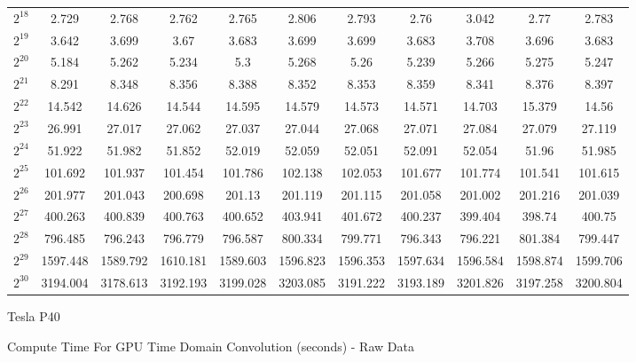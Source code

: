 \begin{center}
\begin{landscape}
\begin{tabular}{c|c|c|c|c|c|c|c|c|c|c}
        $2^{18}$ & 2.729 & 2.768 & 2.762 & 2.765 & 2.806 & 2.793 & 2.76 & 3.042 & 2.77 & 2.783 \\
        $2^{19}$ & 3.642 & 3.699 & 3.67 & 3.683 & 3.699 & 3.699 & 3.683 & 3.708 & 3.696 & 3.683 \\
        $2^{20}$ & 5.184 & 5.262 & 5.234 & 5.3 & 5.268 & 5.26 & 5.239 & 5.266 & 5.275 & 5.247 \\
        $2^{21}$ & 8.291 & 8.348 & 8.356 & 8.388 & 8.352 & 8.353 & 8.359 & 8.341 & 8.376 & 8.397 \\
        $2^{22}$ & 14.542 & 14.626 & 14.544 & 14.595 & 14.579 & 14.573 & 14.571 & 14.703 & 15.379 & 14.56 \\
        $2^{23}$ & 26.991 & 27.017 & 27.062 & 27.037 & 27.044 & 27.068 & 27.071 & 27.084 & 27.079 & 27.119 \\
        $2^{24}$ & 51.922 & 51.982 & 51.852 & 52.019 & 52.059 & 52.051 & 52.091 & 52.054 & 51.96 & 51.985 \\
        $2^{25}$ & 101.692 & 101.937 & 101.454 & 101.786 & 102.138 & 102.053 & 101.677 & 101.774 & 101.541 & 101.615 \\
        $2^{26}$ & 201.977 & 201.043 & 200.698 & 201.13 & 201.119 & 201.115 & 201.058 & 201.002 & 201.216 & 201.039 \\
        $2^{27}$ & 400.263 & 400.839 & 400.763 & 400.652 & 403.941 & 401.672 & 400.237 & 399.404 & 398.74 & 400.75 \\
        $2^{28}$ & 796.485 & 796.243 & 796.779 & 796.587 & 800.334 & 799.771 & 796.343 & 796.221 & 801.384 & 799.447 \\
        $2^{29}$ & 1597.448 & 1589.792 & 1610.181 & 1589.603 & 1596.823 & 1596.353 & 1597.634 & 1596.584 & 1598.874 & 1599.706 \\
        $2^{30}$ & 3194.004 & 3178.613 & 3192.193 & 3199.028 & 3203.085 & 3191.222 & 3193.189 & 3201.826 & 3197.258 & 3200.804 
    \end{tabular}
     Tesla P40
    
    Compute Time For GPU Time Domain Convolution (seconds) - Raw Data
    

\end{landscape}
\end{center}
